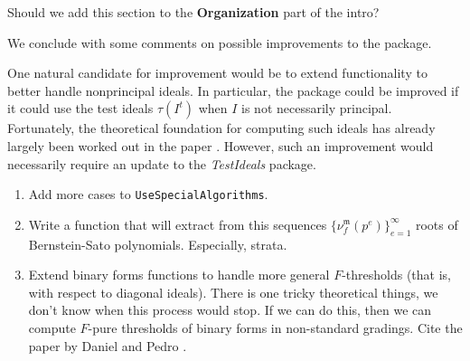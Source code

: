 \documentclass{amsart}
\newcommand{\idealm}{\mathfrak{m}}
\begin{document}
{\color{red} Should we add this section to the \textbf{Organization} part of the intro?}

We conclude with some comments on possible improvements to the package.

One natural candidate for improvement would be to extend functionality to better handle nonprincipal ideals.  In particular, the package could be improved if it could use the test ideals $\tau(I^t)$ when $I$ is not necessarily principal.  Fortunately, the theoretical foundation for computing such ideals has already largely been worked out in the paper \cite{SchwedeTuckerTestIdealsOfNonPrincipal}. However, such an improvement would necessarily require an update to the \emph{TestIdeals} package.

\begin{enumerate}
\item Add more cases to {\tt UseSpecialAlgorithms}.
\item Write a function that will extract from this sequences $\{ \nu_f^{\idealm}(p^e) \}_{e=1}^{\infty}$ roots of Bernstein-Sato polynomials.  Especially, strata.

\item Extend binary forms functions to handle more general $F$-thresholds (that is, with respect to diagonal ideals).  There is one tricky theoretical things, we don't know when this process would stop.  If we can do this, then we can compute $F$-pure thresholds of binary forms in non-standard gradings.  Cite the paper by Daniel and Pedro \cite{HernandezTeixeiraFThresholdFunctions}.
\end{enumerate}




\end{document}
